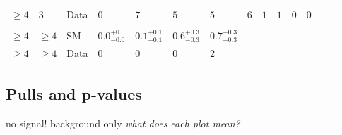 \begin{landscape}
\begin{center}
\begin{table}[h!]
\begin{tabular}{ llllllllllllll }
    $\geq 4$             & $3$      & Data & $0$                   & $7$                  & $5$                   & $5$                  & $6$                   & $1$                  & $1$                  & $0$                  & $0$                  & \multicolumn{2}{c}{}                      \\\\ 
    $\geq 4$             & $\geq 4$ & SM   & $0.0^{+0.0}_{-0.0}$   & $0.1^{+0.1}_{-0.1}$  & $0.6^{+0.3}_{-0.3}$   & $0.7^{+0.3}_{-0.3}$  & \multicolumn{7}{l}{}                                                                                                                                          \\ 
    $\geq 4$             & $\geq 4$ & Data & $0$                   & $0$                  & $0$                   & $2$                  & \multicolumn{7}{l}{}                                                                                                                                         \\ 
    \hline
    \hline
  \end{tabular}
\end{table}
\end{center}
\end{landscape}

\subsection{Pulls and p-values}
no signal! background only
\emph{what does each plot mean?}



